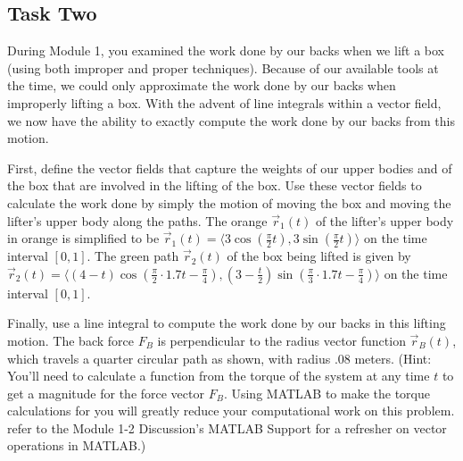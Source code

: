 \documentclass{ximera}
\begin{document}
\subsection{Task Two}

During Module 1, you examined the work done by our backs when we lift a box (using both improper and proper techniques). Because of our available tools at the time, we could only approximate the work done by our backs when improperly lifting a box. With the advent of line integrals within a vector field, we now have the ability to exactly compute the work done by our backs from this motion.

\begin{center}
\end{center}

First, define the vector fields that capture the weights of our upper bodies and of the box that are involved in the lifting of the box. Use these vector fields to calculate the work done by simply the motion of moving the box and moving the lifter's upper body along the paths. The orange $\vec r_1(t)$ of the lifter's upper body in orange is simplified to be $\vec r_1(t)=\langle 3 \cos\left(\frac{\pi}{2} t\right), 3\sin\left(\frac{\pi}{2}t\right)\rangle$ on the time interval $[0,1]$. The green path $\vec r_2(t)$ of the box being lifted is given by $\vec r_2(t)=\langle (4-t) \cos\left(\frac{\pi}{2}\cdot 1.7 t-\frac{\pi}{4}\right), (3-\frac{t}{2})\sin\left(\frac{\pi}{3}\cdot 1.7t-\frac{\pi}{4}\right)\rangle$ on the time interval $[0,1]$.

\begin{center}
\end{center}

Finally, use a line integral to compute the work done by our backs in this lifting motion. The back force $F_B$ is perpendicular to the radius vector function $\vec r_B(t)$, which travels a quarter circular path as shown, with radius $.08$ meters. (Hint: You'll need to calculate a function from the torque of the system at any time $t$ to get a magnitude for the force vector $F_B$. Using MATLAB to make the torque calculations for you will greatly reduce your computational work on this problem. refer to the Module 1-2 Discussion's MATLAB Support for a refresher on vector operations in MATLAB.)
\end{document}
